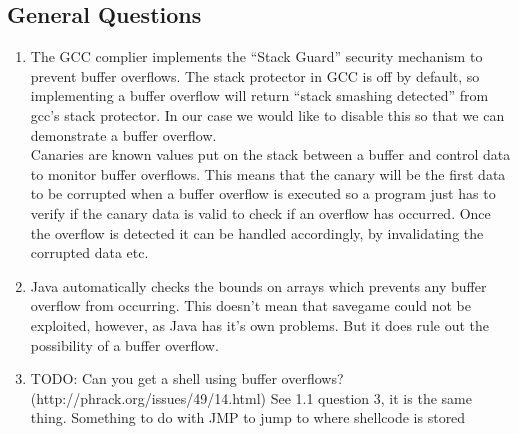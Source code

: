 \documentclass[9pt,a4paper]{article}
\begin{document}
\subsection{General Questions}
\begin{enumerate}
\item The GCC complier implements the ``Stack Guard'' security mechanism to prevent buffer overflows. The stack protector in GCC is off by default, so implementing a buffer overflow will return ``stack smashing detected'' from gcc's stack protector. In our case we would like to disable this so that we can demonstrate a buffer overflow.\\
Canaries are known values put on the stack between a buffer and control data to monitor buffer overflows. This means that the canary will be the first data to be corrupted when a buffer overflow is executed so a program just has to verify if the canary data is valid to check if an overflow has occurred. Once the overflow is detected it can be handled accordingly, by invalidating the corrupted data etc.
\item Java automatically checks the bounds on arrays which prevents any buffer overflow from occurring. This doesn't mean that savegame could not be exploited, however, as Java has it's own problems. But it does rule out the possibility of a buffer overflow.
\item TODO: Can you get a shell using buffer overflows? (http://phrack.org/issues/49/14.html) See 1.1 question 3, it is the same thing. Something to do with JMP to jump to where shellcode is stored
\end{enumerate}
\end{document}
